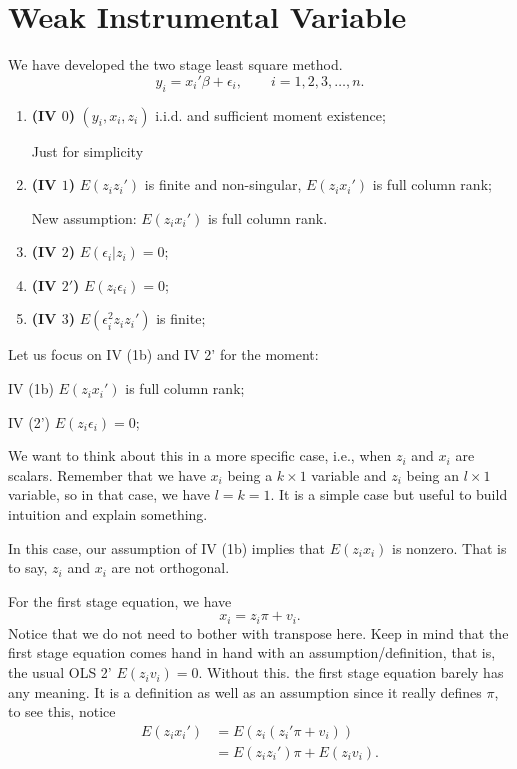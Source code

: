 \documentclass[11pt,a4paper]{amsart}
\theoremstyle{plain}
\theoremstyle{definition}
\begin{document}
\section{Weak Instrumental Variable} 
	We have developed the two stage least square method.
	\[	y_{i} = x_{i}' \beta + \epsilon_{i}, \qquad i= 1,2,3, \dots, n.	\]
	\begin{enumerate}
		\item \textbf{(IV $0$)} $(y_{i}, x_{i}, z_{i})$ i.i.d. and sufficient moment existence;\par 
		Just for simplicity
		\item \textbf{(IV $1$)} $E(z_{i}z_{i}')$ is finite and non-singular, $E(z_{i}x_{i}')$ is full column rank;\par 
		New assumption: $E(z_{i}x_{i}')$ is full column rank.
		\item \textbf{(IV $2$)} $E(\epsilon_{i} | z_{i}) = 0$;
		\item \textbf{(IV $2'$)} $E( z_{i}\epsilon_{i}) = 0$;
		\item \textbf{(IV $3$)} $E(\epsilon_{i}^{2}z_{i}z_{i}')$ is finite;
	\end{enumerate}
	Let us focus on IV (1b) and IV 2' for the moment:
	\begin{framed}
		IV (1b) $E(z_{i}x_{i}')$ is full column rank;\par 
		IV (2')  $E( z_{i}\epsilon_{i}) = 0$;
	\end{framed}
		We want to think about this in a more specific case, i.e., when $z_{i}$ and $x_{i}$ are scalars. Remember that we have $x_{i}$ being a $k \times 1$ variable and $z_{i}$ being an $l \times 1$ variable, so in that case, we have $l = k = 1$. It is a simple case but useful to build intuition and explain something. \par 
		In this case, our assumption of IV (1b) implies that $E(z_{i}x_{i})$ is nonzero. That is to say, $z_{i}$ and $x_{i}$ are not orthogonal. \par 
		For the first stage equation, we have 
		\[	x_{i} = z_{i} \pi + v_{i}.	\]
		Notice that we do not need to bother with transpose here. Keep in mind that the first stage equation comes hand in hand with an assumption/definition, that is, the usual OLS 2' $E(z_{i}v_{i}) = 0$. Without this. the first stage equation barely has any meaning. It is a definition as well as an assumption since it really defines $\pi$, to see this, notice 
		\[	\begin{aligned}
			E(z_{i}x_{i}') &= E(z_{i}(z_{i}'\pi + v_{i})) \\
								&=  E(z_{i}z_{i}')\pi + E(z_{i}v_{i}). \\
		\end{aligned}	\]
\end{document}
